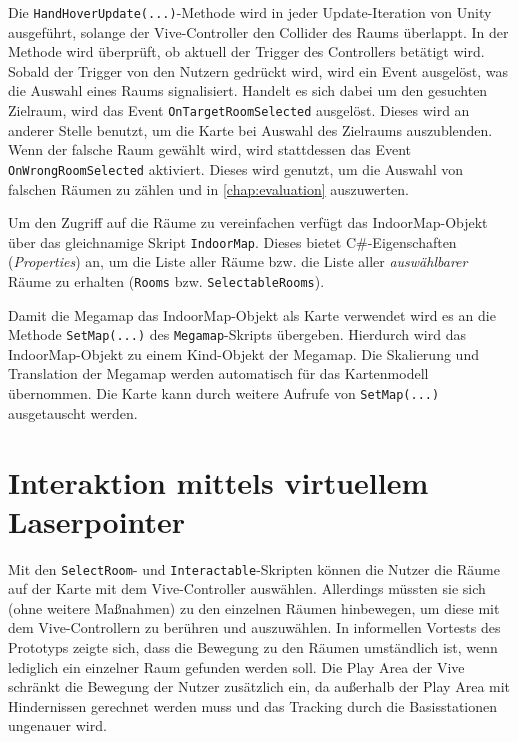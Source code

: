 Die \lstinline|HandHoverUpdate(...)|-Methode wird in jeder Update-Iteration von Unity ausgeführt, solange der Vive-Controller den Collider des Raums überlappt.
In der Methode wird überprüft, ob aktuell der Trigger des Controllers betätigt wird.
Sobald der Trigger von den Nutzern gedrückt wird, wird ein Event ausgelöst, was die Auswahl eines Raums signalisiert.
Handelt es sich dabei um den gesuchten Zielraum, wird das Event \lstinline|OnTargetRoomSelected| ausgelöst.
Dieses wird an anderer Stelle benutzt, um die Karte bei Auswahl des Zielraums auszublenden.
Wenn der falsche Raum gewählt wird, wird stattdessen das Event \lstinline|OnWrongRoomSelected| aktiviert.
Dieses wird genutzt, um die Auswahl von falschen Räumen zu zählen und in \autoref{chap:evaluation} auszuwerten. 

Um den Zugriff auf die Räume zu vereinfachen verfügt das IndoorMap-Objekt über das gleichnamige Skript \lstinline|IndoorMap|.
Dieses bietet C\#-Eigenschaften (\emph{Properties}) an, um die Liste aller Räume bzw. die Liste aller \emph{auswählbarer} Räume zu erhalten (\lstinline|Rooms| bzw. \lstinline|SelectableRooms|).

Damit die Megamap das IndoorMap-Objekt als Karte verwendet wird es an die Methode \lstinline|SetMap(...)| des \lstinline|Megamap|-Skripts übergeben.
Hierdurch wird das IndoorMap-Objekt zu einem Kind-Objekt der Megamap.
Die Skalierung und Translation der Megamap werden automatisch für das Kartenmodell übernommen.
Die Karte kann durch weitere Aufrufe von \lstinline|SetMap(...)| ausgetauscht werden.

\section{Interaktion mittels virtuellem Laserpointer}
Mit den \lstinline|SelectRoom|- und \lstinline|Interactable|-Skripten können die Nutzer die Räume auf der Karte mit dem Vive-Controller auswählen.
Allerdings müssten sie sich (ohne weitere Maßnahmen) zu den einzelnen Räumen hinbewegen, um diese mit dem Vive-Controllern zu berühren und auszuwählen.
In informellen Vortests des Prototyps	 zeigte sich, dass die Bewegung zu den Räumen umständlich ist, wenn lediglich ein einzelner Raum gefunden werden soll.
Die Play Area der Vive schränkt die Bewegung der Nutzer zusätzlich ein, da außerhalb der Play Area mit Hindernissen gerechnet werden muss und das Tracking durch die Basisstationen ungenauer wird.

